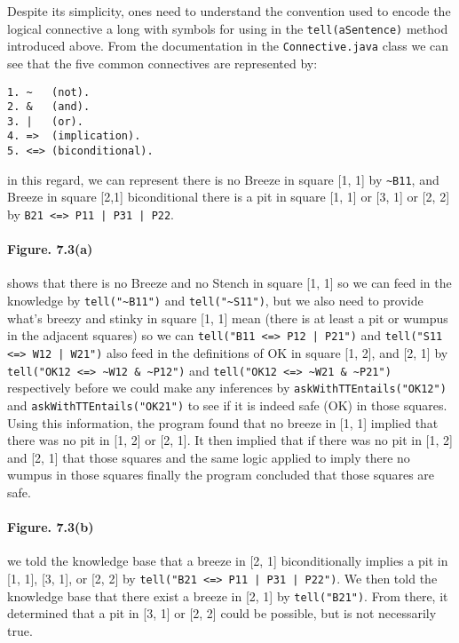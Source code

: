 \documentclass[a4paper]{report}
\begin{document}
Despite its simplicity, ones need to understand the convention used to encode the logical connective a long with symbols for using in the \texttt{tell(aSentence)} method introduced above. From the documentation in the \texttt{Connective.java} class we can see that the five common connectives are represented by: 

\begin{verbatim}
1. ~   (not).
2. &   (and).
3. |   (or).
4. =>  (implication).
5. <=> (biconditional).
\end{verbatim}

\noindent in this regard, we can represent there is no Breeze in square [1, 1] by \texttt{\textasciitilde{}B11}, and Breeze in square [2,1] biconditional there is a pit in square [1, 1] or [3, 1] or [2, 2] by \texttt{B21 <=> P11 | P31 | P22}.

\paragraph{Figure. 7.3(a) } shows that there is no Breeze and no Stench in square [1, 1] so we can feed in the knowledge by \texttt{tell("\textasciitilde{}B11")} and \texttt{tell("\textasciitilde{}S11")}, but we also need to provide what's breezy and stinky in square [1, 1] mean (there is at least a pit or wumpus in the adjacent squares) so we can \texttt{tell("B11 <=> P12 | P21")} and \texttt{tell("S11 <=> W12 | W21")} also feed in the definitions of OK in square [1, 2], and [2, 1] by \texttt{tell("OK12 <=> \textasciitilde{}W12 \& \textasciitilde{}P12")} and \texttt{tell("OK12 <=> \textasciitilde{}W21 \& \textasciitilde{}P21")} respectively before we could make any inferences by \texttt{askWithTTEntails("OK12")} and \texttt{askWithTTEntails("OK21")} to see if it is indeed safe (OK) in those squares. Using this information, the program found that no breeze in [1, 1] implied that there was no pit in [1, 2] or [2, 1]. It then implied that if there was no pit in [1, 2] and [2, 1] that those squares and the same logic applied to imply there no wumpus in those squares finally the program concluded that those squares are safe. \\

\paragraph{Figure. 7.3(b) } we told the knowledge base that a breeze in [2, 1] biconditionally implies a pit in [1, 1], [3, 1], or [2, 2] by \texttt{tell("B21 <=> P11 | P31 | P22")}. We then told the knowledge base that there exist a breeze in [2, 1] by \texttt{tell("B21")}. From there, it determined that a pit in [3, 1] or [2, 2] could be possible, but is not necessarily true. \\
\end{document}
